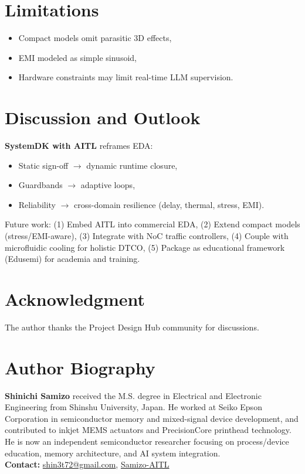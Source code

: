 \documentclass[conference]{IEEEtran}
\begin{document}
\section{Limitations}
\begin{itemize}
  \item Compact models omit parasitic 3D effects,
  \item EMI modeled as simple sinusoid,
  \item Hardware constraints may limit real-time LLM supervision.
\end{itemize}

\section{Discussion and Outlook}
\textbf{SystemDK with AITL} reframes EDA:
\begin{itemize}
  \item Static sign-off $\to$ dynamic runtime closure,
  \item Guardbands $\to$ adaptive loops,
  \item Reliability $\to$ cross-domain resilience (delay, thermal, stress, EMI).
\end{itemize}
Future work:
(1) Embed AITL into commercial EDA,
(2) Extend compact models (stress/EMI-aware),
(3) Integrate with NoC traffic controllers,
(4) Couple with microfluidic cooling for holistic DTCO,
(5) Package as educational framework (Edusemi) for academia and training.

\section*{Acknowledgment}
The author thanks the Project Design Hub community for discussions.





\section*{Author Biography}
\noindent\textbf{Shinichi Samizo}
received the M.S. degree in Electrical and Electronic Engineering from Shinshu University, Japan.
He worked at Seiko Epson Corporation in semiconductor memory and mixed-signal device development, and contributed to inkjet MEMS actuators and PrecisionCore printhead technology.
He is now an independent semiconductor researcher focusing on process/device education, memory architecture, and AI system integration.\\[2pt]
\textbf{Contact:} \href{mailto:shin3t72@gmail.com}{shin3t72@gmail.com},
\href{https://github.com/Samizo-AITL}{Samizo-AITL}
\end{document}
